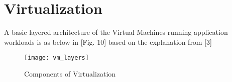 \section{Virtualization}

A basic layered architecture of the Virtual Machines running application workloads is as below in [Fig. 10] based on the explanation from [3]

\begin{figure}
    \centering
    \texttt{[image: vm\_layers]}
    \label{fig:figure8}
    \caption{Components of Virtualization}
\end{figure}
